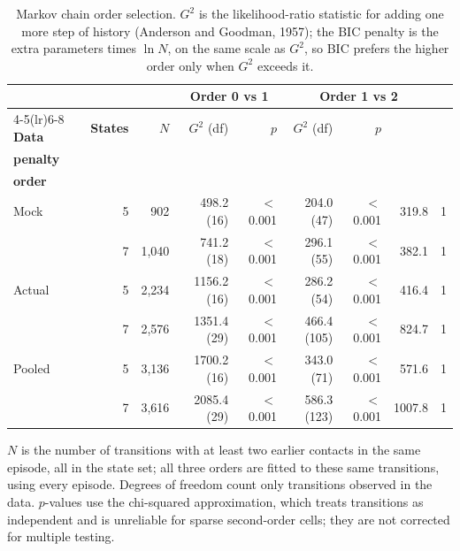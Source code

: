 \begin{table}[htbp]
\centering
\small
\caption{Markov chain order selection. $G^2$ is the likelihood-ratio statistic for adding one more step of history (Anderson and Goodman, 1957); the BIC penalty is the extra parameters times $\ln N$, on the same scale as $G^2$, so BIC prefers the higher order only when $G^2$ exceeds it.}
\label{tab:order_selection}
\setlength{\tabcolsep}{3pt}
\begin{tabular*}{\linewidth}{@{\extracolsep{\fill}}lrrrrrrrc}
\toprule
 & & & \multicolumn{2}{c}{\textbf{Order 0 vs 1}} & \multicolumn{3}{c}{\textbf{Order 1 vs 2}} & \\
\cmidrule(lr){4-5}\cmidrule(lr){6-8}
\textbf{Data} & \textbf{States} & $N$ & $G^2$ (df) & $p$ & $G^2$ (df) & $p$ & \shortstack{\textbf{BIC}\\\textbf{penalty}} & \shortstack{\textbf{BIC}\\\textbf{order}} \\
\midrule
Mock & 5 & 902 & 498.2 (16) & $<$0.001 & 204.0 (47) & $<$0.001 & 319.8 & 1 \\
 & 7 & 1,040 & 741.2 (18) & $<$0.001 & 296.1 (55) & $<$0.001 & 382.1 & 1 \\
\addlinespace
Actual & 5 & 2,234 & 1156.2 (16) & $<$0.001 & 286.2 (54) & $<$0.001 & 416.4 & 1 \\
 & 7 & 2,576 & 1351.4 (29) & $<$0.001 & 466.4 (105) & $<$0.001 & 824.7 & 1 \\
\addlinespace
Pooled & 5 & 3,136 & 1700.2 (16) & $<$0.001 & 343.0 (71) & $<$0.001 & 571.6 & 1 \\
 & 7 & 3,616 & 2085.4 (29) & $<$0.001 & 586.3 (123) & $<$0.001 & 1007.8 & 1 \\
\bottomrule
\end{tabular*}
\par\smallskip
\begin{minipage}{\linewidth}\footnotesize
$N$ is the number of transitions with at least two earlier contacts in the same episode, all in the state set; all three orders are fitted to these same transitions, using every episode. Degrees of freedom count only transitions observed in the data. $p$-values use the chi-squared approximation, which treats transitions as independent and is unreliable for sparse second-order cells; they are not corrected for multiple testing.
\end{minipage}
\end{table}
